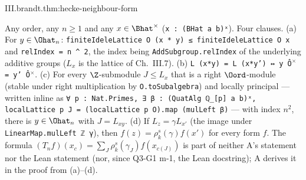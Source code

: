 \begin{tfformal}{III.brandt.thm:hecke-neighbour-form}
\begin{tffidelity}
Any order, any $n\ge1$ and any $x\in\Bhat^\times$ (\texttt{x : (BHat a b)ˣ}). Four clauses. (a) For $y\in\Ohat_n$: \texttt{finiteIdeleLattice O (x * y) ≤ finiteIdeleLattice O x} and \texttt{relIndex = n \^{} 2}, the index being \texttt{AddSubgroup.relIndex} of the underlying additive groups ($L_x$ is the lattice of Ch.~III.7). (b) \texttt{L (x*y) = L (x*y') ↔ y Ô$^\times$ = y' Ô$^\times$}. (c) For every $\Z$-submodule $J\le L_x$ that is a right $\Oord$-module (stable under right multiplication by \texttt{O.toSubalgebra}) and locally principal --- written inline as \texttt{∀ p : Nat.Primes, ∃ β : (QuatAlg ℚ\_[p] a b)ˣ, localLattice p J = (localLattice p O).map (mulLeft β)} --- with index $n^2$, there is $y\in\Ohat_n$ with $J=L_{xy}$. (d) If $L_z=\gamma L_{x'}$ (the image under \texttt{LinearMap.mulLeft ℤ γ}), then $f(z)=\rho_k^s(\gamma)f(x')$ for every form $f$. The formula $(T_nf)(x_c)=\sum_J\rho_k^s(\gamma_J)f(x_{c(J)})$ is part of neither A's statement nor the Lean statement (nor, since Q3-G1 m-1, the Lean docstring); A derives it in the proof from (a)--(d).
\end{tffidelity}
\end{tfformal}
